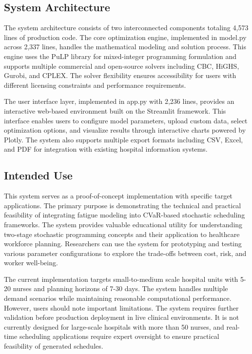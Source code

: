 \documentclass[11pt,letterpaper]{article}
\begin{document}
\subsection{System Architecture}
The system architecture consists of two interconnected components totaling 4,573 lines of production code. The core optimization engine, implemented in model.py across 2,337 lines, handles the mathematical modeling and solution process. This engine uses the PuLP library for mixed-integer programming formulation and supports multiple commercial and open-source solvers including CBC, HiGHS, Gurobi, and CPLEX. The solver flexibility ensures accessibility for users with different licensing constraints and performance requirements.

The user interface layer, implemented in app.py with 2,236 lines, provides an interactive web-based environment built on the Streamlit framework. This interface enables users to configure model parameters, upload custom data, select optimization options, and visualize results through interactive charts powered by Plotly. The system also supports multiple export formats including CSV, Excel, and PDF for integration with existing hospital information systems.

\subsection{Intended Use}
This system serves as a proof-of-concept implementation with specific target applications. The primary purpose is demonstrating the technical and practical feasibility of integrating fatigue modeling into CVaR-based stochastic scheduling frameworks. The system provides valuable educational utility for understanding two-stage stochastic programming concepts and their application to healthcare workforce planning. Researchers can use the system for prototyping and testing various parameter configurations to explore the trade-offs between cost, risk, and worker well-being.

The current implementation targets small-to-medium scale hospital units with 5-20 nurses and planning horizons of 7-30 days. The system handles multiple demand scenarios while maintaining reasonable computational performance. However, users should note important limitations. The system requires further validation before production deployment in live clinical environments. It is not currently designed for large-scale hospitals with more than 50 nurses, and real-time scheduling applications require expert oversight to ensure practical feasibility of generated schedules.
\end{document}
